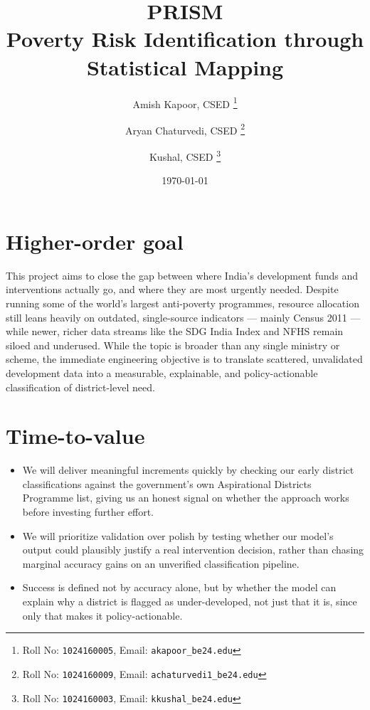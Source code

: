 \documentclass[11pt,a4paper]{article}
\title{\textbf{PRISM}\\[4pt] \large Poverty Risk Identification through Statistical Mapping}
\author{
  Amish Kapoor, CSED%
  \thanks{Roll No: \texttt{1024160005}, %
    Email: \texttt{akapoor\_be24\@thapar.edu}}
  \and 
  Aryan Chaturvedi, CSED%
  \thanks{Roll No: \texttt{1024160009}, %
    Email: \texttt{achaturvedi1\_be24\@thapar.edu}}
  \and 
  Kushal, CSED%
  \thanks{Roll No: \texttt{1024160003}, %
    Email: \texttt{kkushal\_be24\@thapar.edu}}
}
\date{\today}
\newcommand{\BvrHint}[1]{%
  {\normalfont\normalsize\itshape\hfill #1}}
\begin{document}
\maketitle

\section{Higher-order goal%
  }
This project aims to close the gap between where India's development funds and interventions actually go, and where they are most urgently needed. Despite running some of the world's largest anti-poverty programmes, resource allocation still leans heavily on outdated, single-source indicators — mainly Census 2011 — while newer, richer data streams like the SDG India Index and NFHS remain siloed and underused. While the topic is broader than any single ministry or scheme, the immediate engineering objective is to translate scattered, unvalidated development data into a measurable, explainable, and policy-actionable classification of district-level need.

\section{Time-to-value %
}
\begin{itemize}[leftmargin=0.7cm]
    \item We will deliver meaningful increments quickly by checking our early district classifications against the government's own Aspirational Districts Programme list, giving us an honest signal on whether the approach works before investing further effort.
    \item We will prioritize validation over polish by testing whether our model's output could plausibly justify a real intervention decision, rather than chasing marginal accuracy gains on an unverified classification pipeline.
    \item Success is defined not by accuracy alone, but by whether the model can explain why a district is flagged as under-developed, not just that it is, since only that makes it policy-actionable.
\end{itemize}
\end{document}

